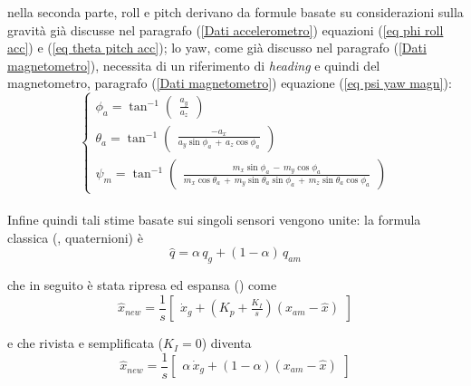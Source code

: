 nella seconda parte, roll e pitch derivano da formule basate su considerazioni sulla gravità già discusse nel paragrafo (\ref{Dati accelerometro}) equazioni (\ref{eq phi roll acc}) e (\ref{eq theta pitch acc}); lo yaw, come già discusso nel paragrafo (\ref{Dati magnetometro}), necessita di un riferimento di \textit{heading} e quindi del magnetometro, paragrafo (\ref{Dati magnetometro}) equazione (\ref{eq psi yaw magn}):\\

\begin{equation*}
    \begin{cases}
        \phi_a = \tan^{-1} \begin{pmatrix} \frac{a_y}{a_z} \end{pmatrix}\\
        \theta_a = \tan^{-1} \begin{pmatrix} \frac{-a_x}{a_y \sin{\phi_a} \, + \, a_z \cos{\phi_a}} \end{pmatrix}\\
        \psi_m = \tan^{-1} \begin{pmatrix} \frac{m_x \sin{\phi_a} \, - \, m_y \cos{\phi_a}}{m_x \cos{\theta_a} \, + \, m_y \sin{\theta_a} \sin{\phi_a} \, + \, m_z \sin{\theta_a} \cos{\phi_a}} \end{pmatrix}
    \end{cases}
\end{equation*}\\


Infine quindi tali stime basate sui singoli sensori vengono unite: la formula classica (\cite{ahrs}, quaternioni) è
\begin{equation}
    \hat{q} = \alpha \, q_g + (1 - \alpha) \, q_{am}
\end{equation}

che in seguito è stata ripresa ed espansa (\cite{KOTTATH2017574}) come
\begin{equation}
    \hat{x}_{new} = \frac{1}{s} \begin{bmatrix} \dot{x}_g + (K_p + \frac{K_I}{s}) (x_{am} - \hat{x}) \end{bmatrix}
\end{equation}

e che rivista e semplificata ($K_I = 0$) diventa
\begin{equation}
    \hat{x}_{new} = \frac{1}{s} \begin{bmatrix} \alpha \, \dot{x}_g + (1 - \alpha) (x_{am} - \hat{x}) \end{bmatrix}
\end{equation}

